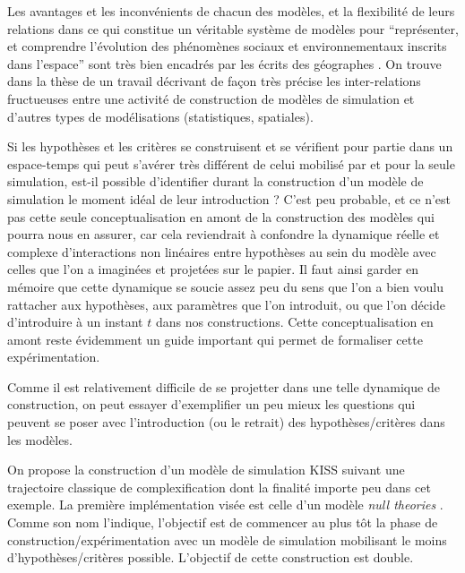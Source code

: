 Les avantages et les inconvénients de chacun des modèles, et la flexibilité de leurs relations dans ce qui constitue un véritable système de modèles pour \enquote{représenter, et comprendre l'évolution des phénomènes sociaux et environnementaux inscrits dans l'espace} sont très bien encadrés par les écrits des géographes \textcites{Sanders2000, Mathian2014}. On trouve dans la thèse de \textcite{Cottineau2014a, Cottineau2014b} un travail décrivant de façon très précise les inter-relations fructueuses entre une activité de construction de modèles de simulation et d'autres types de modélisations (statistiques, spatiales).



Si les hypothèses et les critères se construisent et se vérifient pour partie dans un espace-temps qui peut s'avérer très différent de celui mobilisé par et pour la seule simulation, est-il possible d'identifier durant la construction d'un modèle de simulation le moment idéal de leur introduction ? C'est peu probable, et ce n'est pas cette seule conceptualisation en amont de la construction des modèles qui pourra nous en assurer, car cela reviendrait à confondre la dynamique réelle et complexe d'interactions non linéaires entre hypothèses au sein du modèle avec celles que l'on a imaginées et projetées sur le papier. Il faut ainsi garder en mémoire que cette dynamique se soucie assez peu du sens que l'on a bien voulu rattacher aux hypothèses, aux paramètres que l'on introduit, ou que l'on décide d'introduire à un instant $t$ dans nos constructions. Cette conceptualisation en amont reste évidemment un guide important qui permet de formaliser cette expérimentation.

Comme il est relativement difficile de se projetter dans une telle dynamique de construction, on peut essayer d'exemplifier un peu mieux les questions qui peuvent se poser avec l'introduction (ou le retrait) des hypothèses/critères dans les modèles.

On propose la construction d'un modèle de simulation KISS suivant une trajectoire classique de complexification dont la finalité importe peu dans cet exemple. La première implémentation visée est celle d'un modèle \textit{null theories} \autocite{Railsback2012}. Comme son nom l'indique, l'objectif est de commencer au plus tôt la phase de construction/expérimentation avec un modèle de simulation mobilisant le moins d'hypothèses/critères possible. L'objectif de cette construction est double.

